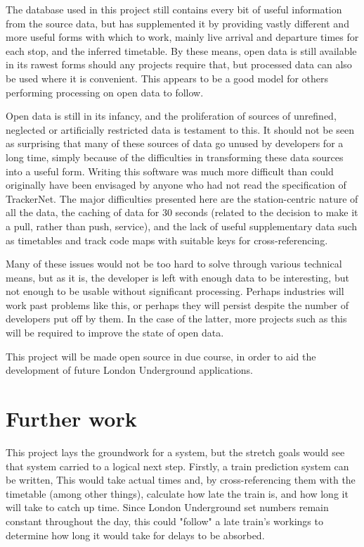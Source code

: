 \documentclass[a4paper,12pt,twoside]{report}
\begin{document}
The database used in this project still contains every bit of useful
information from the source data, but has supplemented it by providing vastly
different and more useful forms with which to work, mainly live arrival and
departure times for each stop, and the inferred timetable. By these means, open
data is still available in its rawest forms should any projects require that,
but processed data can also be used where it is convenient. This appears to be
a good model for others performing processing on open data to follow.

Open data is still in its infancy, and the proliferation of sources of
unrefined, neglected or artificially restricted data is testament to this. It
should not be seen as surprising that many of these sources of data go unused
by developers for a long time, simply because of the difficulties in
transforming these data sources into a useful form. Writing this software was
much more difficult than could originally have been envisaged by anyone who had
not read the specification of TrackerNet. The major difficulties presented here
are the station-centric nature of all the data, the caching of data for 30
seconds (related to the decision to make it a pull, rather than push, service),
and the lack of useful supplementary data such as timetables and track code
maps with suitable keys for cross-referencing.

Many of these issues would not be too hard to solve through various technical
means, but as it is, the developer is left with enough data to be interesting,
but not enough to be usable without significant processing. Perhaps industries
will work past problems like this, or perhaps they will persist despite the
number of developers put off by them. In the case of the latter, more projects
such as this will be required to improve the state of open data.

This project will be made open source in due course, in order to aid the
development of future London Underground applications.

\section{Further work}

This project lays the groundwork for a system, but the stretch goals would see
that system carried to a logical next step. Firstly, a train prediction system
can be written, This would take actual times and, by cross-referencing them
with the timetable (among other things), calculate how late the train is, and
how long it will take to catch up time. Since London Underground set numbers
remain constant throughout the day, this could "follow" a late train's workings
to determine how long it would take for delays to be absorbed.
\end{document}
